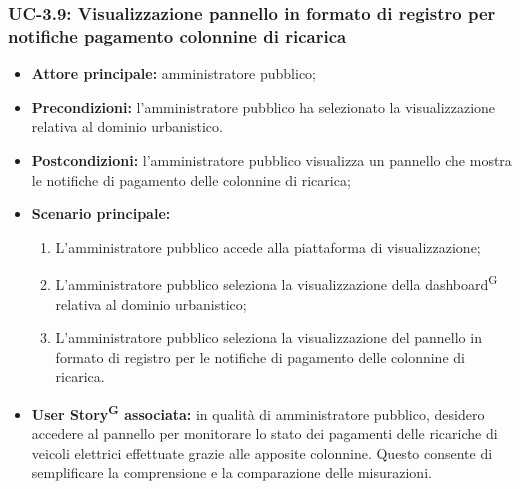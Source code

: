 \documentclass[8pt]{article}
\newcommand{\glossterm}[1]{#1\textsuperscript{G}} %
\begin{document}
\subsubsection*{UC-3.9: Visualizzazione pannello in formato di registro per notifiche pagamento colonnine di ricarica}
\begin{itemize}
    \item \textbf{Attore principale:} amministratore pubblico;
    \item \textbf{Precondizioni:} l’amministratore pubblico ha selezionato la visualizzazione
        relativa al dominio urbanistico.
    \item \textbf{Postcondizioni:} l'amministratore pubblico visualizza un pannello che mostra le notifiche di pagamento delle colonnine di ricarica;
    \item \textbf{Scenario principale:} 
    \begin{enumerate}
    \item L’amministratore pubblico accede alla piattaforma di visualizzazione;
    \item L’amministratore pubblico seleziona la visualizzazione della \glossterm{dashboard} relativa al dominio urbanistico;
    \item L’amministratore pubblico seleziona la visualizzazione del pannello in formato di registro per le notifiche di pagamento delle colonnine di ricarica.
    \end{enumerate}
    \item \textbf{\glossterm{User Story} associata:} in qualità di amministratore pubblico, desidero accedere al pannello per monitorare lo stato dei pagamenti delle ricariche di veicoli elettrici effettuate grazie alle apposite colonnine. Questo consente di semplificare la comprensione e la comparazione delle misurazioni.
\end{itemize}
\end{document}
